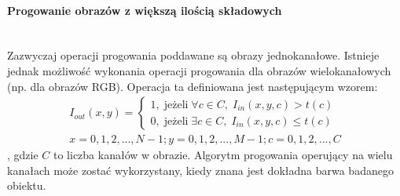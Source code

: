 \paragraph{Progowanie obrazów z większą ilością składowych}\mbox{}\\
Zazwyczaj operacji progowania poddawane są obrazy jednokanałowe. Istnieje jednak możliwość wykonania operacji progowania dla obrazów wielokanałowych (np. dla obrazów RGB). Operacja ta definiowana jest następującym wzorem:
\begin{gather*}
  I_{out}(x, y) = \left\{\begin{matrix}
  1, \; \text{jeżeli} \; \forall c \in C, \; I_{in}(x, y, c) > t(c)\\
  0, \; \text{jeżeli} \; \exists c \in C, \; I_{in}(x, y, c) \leq t(c)
  \end{matrix}\right.\\ x=0,1,2,...,N-1; y=0,1,2,...,M-1; c=0,1,2,...,C
\end{gather*},
gdzie $C$ to liczba kanałów w obrazie.
Algorytm progowania operujący na wielu kanałach może zostać wykorzystany, kiedy znana jest dokładna barwa badanego obiektu.

